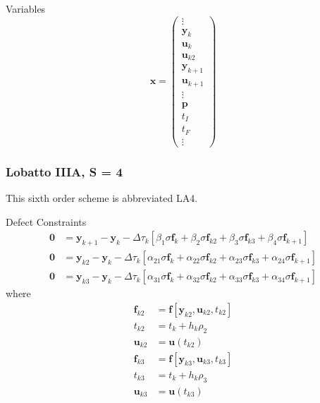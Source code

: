 \documentclass[]{article}
\begin{document}
\noindent Variables 
\begin{equation}
    \mathbf{x} = \begin{pmatrix}
        \vdots \\ \mathbf{y}_k \\ \mathbf{u}_k \\ \mathbf{u}_{k2} \\ \mathbf{y}_{k+1} \\ \mathbf{u}_{k+1} \\ \vdots \\ \mathbf{p} \\ t_I \\ t_F \\ \vdots
    \end{pmatrix}
\end{equation}

\subsubsection{Lobatto IIIA, S = 4}
This sixth order scheme is abbreviated LA4.\vspace{2mm}

\noindent Defect Constraints
\begin{align}
    \mathbf{0} &= \mathbf{y}_{k+1} - \mathbf{y}_k - \Delta\tau_k\left[\beta_1\sigma\mathbf{f}_k + \beta_2\sigma\mathbf{f}_{k2} + \beta_3\sigma\mathbf{f}_{k3} + \beta_4\sigma\mathbf{f}_{k+1}\right] \\ 
    \mathbf{0} &= \mathbf{y}_{k2} - \mathbf{y}_k - \Delta\tau_k\left[\alpha_{21}\sigma\mathbf{f}_k + \alpha_{22}\sigma\mathbf{f}_{k2} + \alpha_{23}\sigma\mathbf{f}_{k3} + \alpha_{24}\sigma\mathbf{f}_{k+1}\right] \\ 
    \mathbf{0} &= \mathbf{y}_{k3} - \mathbf{y}_k - \Delta\tau_k\left[\alpha_{31}\sigma\mathbf{f}_k + \alpha_{32}\sigma\mathbf{f}_{k2} + \alpha_{33}\sigma\mathbf{f}_{k3} + \alpha_{34}\sigma\mathbf{f}_{k+1}\right]
\end{align}
where
\begin{align}
    \mathbf{f}_{k2} &= \mathbf{f}\left[\mathbf{y}_{k2},\mathbf{u}_{k2},t_{k2}\right] \\ 
    t_{k2} &= t_k + h_k\rho_2 \\ 
    \mathbf{u}_{k2} &= \mathbf{u}(t_{k2}) \\ 
    \mathbf{f}_{k3} &= \mathbf{f}\left[\mathbf{y}_{k3},\mathbf{u}_{k3},t_{k3}\right] \\ 
    t_{k3} &= t_k + h_k\rho_3 \\ 
    \mathbf{u}_{k3} &= \mathbf{u}(t_{k3})
\end{align}
\vspace{2mm}
\end{document}
